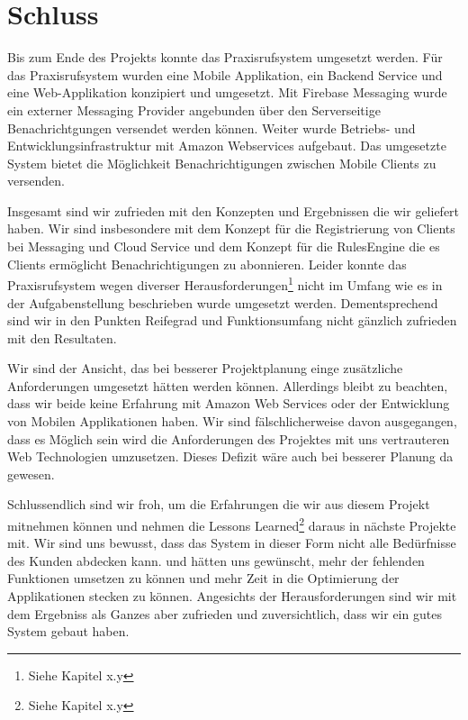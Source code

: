\section {Schluss}

Bis zum Ende des Projekts konnte das Praxisrufsystem umgesetzt werden.
Für das Praxisrufsystem wurden eine Mobile Applikation, ein Backend Service und eine Web-Applikation konzipiert und umgesetzt.
Mit Firebase Messaging wurde ein externer Messaging Provider angebunden über den Serverseitige Benachrichtgungen versendet werden können.
Weiter wurde Betriebs- und Entwicklungsinfrastruktur mit Amazon Webservices aufgebaut.
Das umgesetzte System bietet die Möglichkeit Benachrichtigungen zwischen Mobile Clients zu versenden.

Insgesamt sind wir zufrieden mit den Konzepten und Ergebnissen die wir geliefert haben.
Wir sind insbesondere mit dem Konzept für die Registrierung von Clients bei Messaging und Cloud Service und dem Konzept für die RulesEngine die es Clients ermöglicht Benachrichtigungen zu abonnieren.
Leider konnte das Praxisrufsystem wegen diverser Herausforderungen\footnote{Siehe Kapitel x.y} nicht im Umfang wie es in der Aufgabenstellung beschrieben wurde umgesetzt werden.
Dementsprechend sind wir in den Punkten Reifegrad und Funktionsumfang nicht gänzlich zufrieden mit den Resultaten.

Wir sind der Ansicht, das bei besserer Projektplanung einge zusätzliche Anforderungen umgesetzt hätten werden können.
Allerdings bleibt zu beachten, dass wir beide keine Erfahrung mit Amazon Web Services oder der Entwicklung von Mobilen Applikationen haben.
Wir sind fälschlicherweise davon ausgegangen, dass es Möglich sein wird die Anforderungen des Projektes mit uns vertrauteren Web Technologien umzusetzen.
Dieses Defizit wäre auch bei besserer Planung da gewesen.

Schlussendlich sind wir froh, um die Erfahrungen die wir aus diesem Projekt mitnehmen können und nehmen die Lessons Learned\footnote{Siehe Kapitel x.y} daraus in nächste Projekte mit.
Wir sind uns bewusst, dass das System in dieser Form nicht alle Bedürfnisse des Kunden abdecken kann.
und hätten uns gewünscht, mehr der fehlenden Funktionen umsetzen zu können und mehr Zeit in die Optimierung der Applikationen stecken zu können.
Angesichts der Herausforderungen sind wir mit dem Ergebniss als Ganzes aber zufrieden und zuversichtlich, dass wir ein gutes System gebaut haben.
